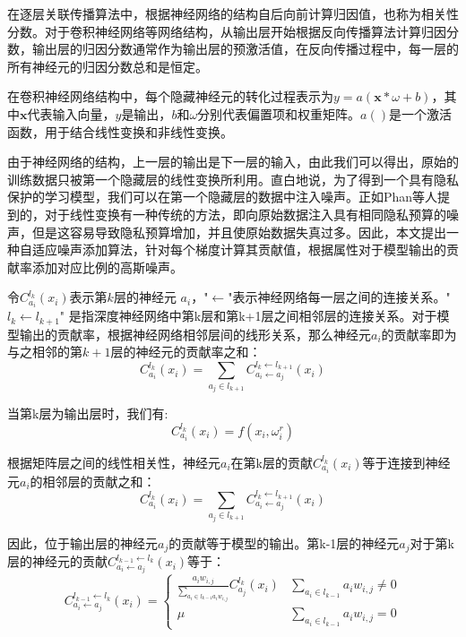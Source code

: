 在逐层关联传播算法中，根据神经网络的结构自后向前计算归因值，也称为相关性分数。对于卷积神经网络等网络结构，从输出层开始根据反向传播算法计算归因分数，输出层的归因分数通常作为输出层的预激活值，在反向传播过程中，每一层的所有神经元的归因分数总和是恒定。

在卷积神经网络结构中，每个隐藏神经元的转化过程表示为$y=a(\mathbf{x} * \omega+b)$，其中$\mathbf{x}$代表输入向量，$y$是输出，$b$和$\omega$分别代表{}偏置项和权重矩阵。$a()$是一个激活函数，用于结合线性变换和非线性变换。

由于神经网络的结构，上一层的输出是下一层的输入，由此我们可以得出，原始的训练数据只被第一个隐藏层的线性变换所利用。直白地说，为了得到一个具有隐私保护的学习模型，我们可以在第一个隐藏层的数据中注入噪声。正如Phan等人提到的，对于线性变换有一种传统的方法，即向原始数据注入具有相同隐私预算的噪声，但是这容易导致隐私预算增加，并且使原始数据失真过多。因此，本文提出一种自适应噪声添加算法，针对每个梯度计算其贡献值，根据属性对于模型输出的贡献率添加对应比例的高斯噪声。

令$C_{a_{i}}^{l_{k}}\left(x_{i}\right)$表示第$k$层的神经元 $a_{i}$，"$\leftarrow$"表示神经网络每一层之间的连接关系。"$l_{k} \leftarrow l_{k+1}$" 是指深度神经网络中第k层和第k+1层之间相邻层的连接关系。对于模型输出的贡献率，根据神经网络相邻层间的线形关系，那么神经元$a_{i}$的贡献率即为与之相邻的第$k+1$层的神经元的贡献率之和：
$$
C_{a_{i}}^{l_{k}}\left(x_{i}\right)=\sum_{a_{j} \in l_{k+1}} C_{a_{i} \leftarrow a_{j}}^{l_{k} \leftarrow l_{k+1}}\left(x_{i}\right)
$$

当第k层为输出层时，我们有:
\begin{equation}
C_{a_{i}}^{l_{k}}\left(x_{i}\right)=f\left(x_{i}, \omega_{i}^{r}\right)
\end{equation}

根据矩阵层之间的线性相关性，神经元$a_{i}$在第k层的贡献$C_{a_{i}}^{l_{k}}\left(x_{i}\right)$等于连接到神经元$a_{i}$的相邻层的贡献之和：
\begin{equation}\label{eq:层间传播1}
C_{a_{i}}^{l_{k}}\left(x_{i}\right)=\sum_{a_{j} \in l_{k+1}} C_{a_{i} \leftarrow a_{j}}^{l_{k} \leftarrow l_{k+1}}\left(x_{i}\right)
\end{equation}

因此，位于输出层的神经元$a_{j}$的贡献等于模型的输出。第k-1层的神经元$a_{j}$对于第k层的神经元的贡献$C_{a_{i} \leftarrow a_{j}}^{l_{k-1} \leftarrow l_{k}}\left(x_{i}\right)$等于：
\begin{equation}
C_{a_{i} \leftarrow a_{j}}^{l_{k-1} \leftarrow l_{k}}\left(x_{i}\right)=\left\{\begin{array}{cc}\frac{a_{i} w_{i, j}}{\sum_{a_{i} \in l_{k-1} a_{i} w_{i, j}}} C_{a_{j}}^{l_{k}}\left(x_{i}\right) & \sum_{a_{i} \in l_{k-1}} a_{i} w_{i, j} \neq 0 \\ \mu & \sum_{a_{i} \in l_{k-1}} a_{i} w_{i, j}=0\end{array}\right.
\end{equation}

